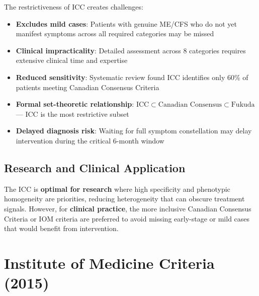 \begin{warning}
\label{warn:icc-limitations}
The restrictiveness of ICC creates challenges:
\begin{itemize}
    \item \textbf{Excludes mild cases}: Patients with genuine ME/CFS who do not yet manifest symptoms across all required categories may be missed
    \item \textbf{Clinical impracticality}: Detailed assessment across 8 categories requires extensive clinical time and expertise
    \item \textbf{Reduced sensitivity}: Systematic review found ICC identifies only 60\% of patients meeting Canadian Consensus Criteria~\cite{Brurberg2014}
    \item \textbf{Formal set-theoretic relationship}: $\text{ICC} \subset \text{Canadian Consensus} \subset \text{Fukuda}$ --- ICC is the most restrictive subset
    \item \textbf{Delayed diagnosis risk}: Waiting for full symptom constellation may delay intervention during the critical 6-month window
\end{itemize}
\end{warning}

\subsection{Research and Clinical Application}

The ICC is \textbf{optimal for research} where high specificity and phenotypic homogeneity are priorities, reducing heterogeneity that can obscure treatment signals. However, for \textbf{clinical practice}, the more inclusive Canadian Consensus Criteria or IOM criteria are preferred to avoid missing early-stage or mild cases that would benefit from intervention.

\section{Institute of Medicine Criteria (2015)}

